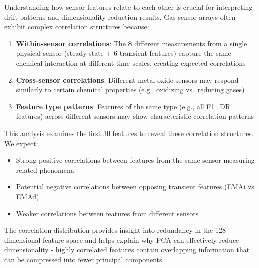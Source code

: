 \documentclass[
  letterpaper,
  DIV=11,
  numbers=noendperiod]{scrartcl}
\providecommand{\tightlist}{%
  \setlength{\itemsep}{0pt}\setlength{\parskip}{0pt}}
\begin{document}
Understanding how sensor features relate to each other is crucial for
interpreting drift patterns and dimensionality reduction results. Gas
sensor arrays often exhibit complex correlation structures because:

\begin{enumerate}
\def\labelenumi{\arabic{enumi}.}
\item
  \textbf{Within-sensor correlations}: The 8 different measurements from
  a single physical sensor (steady-state + 6 transient features) capture
  the same chemical interaction at different time scales, creating
  expected correlations
\item
  \textbf{Cross-sensor correlations}: Different metal oxide sensors may
  respond similarly to certain chemical properties (e.g., oxidizing
  vs.~reducing gases)
\item
  \textbf{Feature type patterns}: Features of the same type (e.g., all
  F1\_DR features) across different sensors may show characteristic
  correlation patterns
\end{enumerate}

This analysis examines the first 30 features to reveal these correlation
structures. We expect:

\begin{itemize}
\tightlist
\item
  Strong positive correlations between features from the same sensor
  measuring related phenomena
\item
  Potential negative correlations between opposing transient features
  (EMAi vs EMAd)
\item
  Weaker correlations between features from different sensors
\end{itemize}

The correlation distribution provides insight into redundancy in the
128-dimensional feature space and helps explain why PCA can effectively
reduce dimensionality - highly correlated features contain overlapping
information that can be compressed into fewer principal components.
\end{document}
